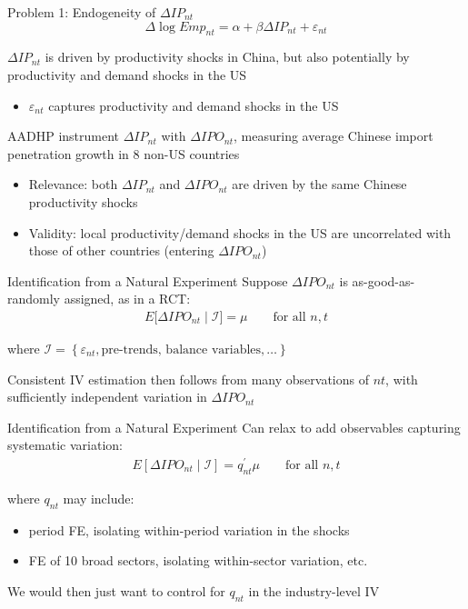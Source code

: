 \documentclass[t]{beamer}
\begin{document}
\begin{frame}[t]{Problem 1: Endogeneity of $\Delta IP_{nt}$}
\vspace{-0.5cm}
$$\Delta\log Emp_{nt}=\alpha+\beta \Delta IP_{nt}+\varepsilon_{nt}$$

$\Delta IP_{nt}$ is driven by productivity shocks in China, but also potentially by productivity and demand shocks in the US %
\smallskip
\begin{itemize}
\item $\varepsilon_{nt}$ captures productivity and demand shocks in the US %
\end{itemize}

\pause
AADHP instrument $\Delta IP_{nt}$ with $\Delta IPO_{nt}$, measuring average Chinese import penetration growth in 8 non-US countries\smallskip\pause
	\begin{itemize}
	\item Relevance: both  $\Delta IP_{nt}$ and $\Delta IPO_{nt}$ are driven by the same Chinese productivity shocks
	\item Validity: local productivity/demand shocks in the US are uncorrelated with those of other countries (entering $\Delta IPO_{nt}$)
	\end{itemize}
\end{frame}

\begin{frame}{Identification from a Natural Experiment}
\vspace{-0.2cm}
Suppose $\Delta IPO_{nt}$ is as-good-as-randomly assigned, as in a RCT: 
\begin{align*}
E[\Delta IPO_{nt}\mid \mathcal{I]}=\mu\qquad\text{for all }n,t
\end{align*}

where $\mathcal{I}=\left\{\varepsilon_{nt},\text{pre-trends, balance variables},\dots\right\}$
\pause\bigskip


Consistent IV estimation then follows from many observations of $nt$, with sufficiently independent variation in $\Delta IPO_{nt}$
\end{frame}

\begin{frame}{Identification from a Natural Experiment}
Can relax to add observables capturing systematic variation:
\begin{align*}
E[\Delta IPO_{nt}\mid \mathcal{I}]=q_{nt}^\prime\mu\qquad\text{for all }n,t
\end{align*}

where $q_{nt}$ may include:
\smallskip
\begin{itemize}
\item period FE, isolating within-period variation in the shocks \smallskip
\item FE of 10 broad sectors, isolating within-sector variation, etc. 
\end{itemize}\smallskip\pause
We would then just want to control for $q_{nt}$ in the industry-level IV
\end{frame}
\end{document}

